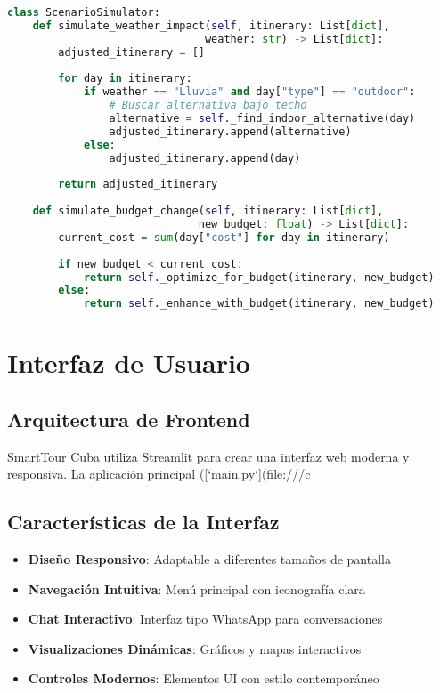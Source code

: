 \documentclass[runningheads]{llncs}
\begin{document}
\begin{lstlisting}[language=Python, caption=Motor de simulación]
class ScenarioSimulator:
    def simulate_weather_impact(self, itinerary: List[dict], 
                               weather: str) -> List[dict]:
        adjusted_itinerary = []
        
        for day in itinerary:
            if weather == "Lluvia" and day["type"] == "outdoor":
                # Buscar alternativa bajo techo
                alternative = self._find_indoor_alternative(day)
                adjusted_itinerary.append(alternative)
            else:
                adjusted_itinerary.append(day)
                
        return adjusted_itinerary
        
    def simulate_budget_change(self, itinerary: List[dict], 
                              new_budget: float) -> List[dict]:
        current_cost = sum(day["cost"] for day in itinerary)
        
        if new_budget < current_cost:
            return self._optimize_for_budget(itinerary, new_budget)
        else:
            return self._enhance_with_budget(itinerary, new_budget)
\end{lstlisting}

\section{Interfaz de Usuario}

\subsection{Arquitectura de Frontend}

SmartTour Cuba utiliza Streamlit para crear una interfaz web moderna y responsiva. La aplicación principal ([`main.py`](file:///c%

\subsection{Características de la Interfaz}

\begin{itemize}
\item \textbf{Diseño Responsivo}: Adaptable a diferentes tamaños de pantalla
\item \textbf{Navegación Intuitiva}: Menú principal con iconografía clara
\item \textbf{Chat Interactivo}: Interfaz tipo WhatsApp para conversaciones
\item \textbf{Visualizaciones Dinámicas}: Gráficos y mapas interactivos
\item \textbf{Controles Modernos}: Elementos UI con estilo contemporáneo
\end{itemize}
\end{document}
